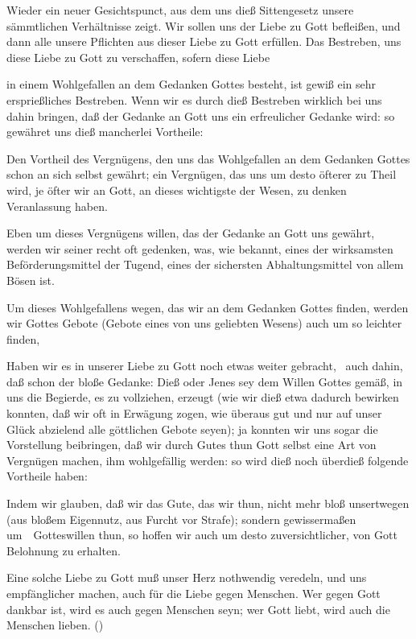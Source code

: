 \begin{aufza}
Wieder ein neuer Gesichtspunct, aus dem uns dieß Sittengesetz unsere sämmtlichen Verhältnisse zeigt. Wir sollen uns der Liebe zu Gott befleißen, und dann alle unsere Pflichten aus dieser Liebe zu Gott erfüllen. Das Bestreben, uns diese Liebe zu Gott zu verschaffen, sofern diese Liebe
\begin{aufzb}
\item in einem Wohlgefallen an dem Gedanken Gottes besteht, ist gewiß ein sehr ersprießliches Bestreben. Wenn wir es durch dieß Bestreben wirklich bei uns dahin bringen, daß der Gedanke an Gott uns ein erfreulicher Gedanke wird: so gewähret uns dieß mancherlei Vortheile:
\begin{aufzc}
\item Den Vortheil des Vergnügens, den uns das Wohlgefallen an dem Gedanken Gottes schon an sich selbst gewährt; ein Vergnügen, das uns um desto öfterer zu Theil wird, je öfter wir an Gott, an dieses wichtigste der Wesen, zu denken Veranlassung haben.
\item Eben um dieses Vergnügens willen, das der Gedanke an Gott uns gewährt, werden wir seiner recht oft gedenken, was, wie bekannt, eines der wirksamsten Beförderungsmittel der Tugend, eines der sichersten Abhaltungsmittel von allem Bösen ist.
\item Um dieses Wohlgefallens wegen, das wir an dem Gedanken Gottes finden, werden wir Gottes Gebote (Gebote eines von uns geliebten Wesens) auch um so leichter finden, \usw\
\end{aufzc}
\item Haben wir es in unserer Liebe zu Gott noch etwas weiter gebracht, \zB\  auch dahin, daß schon der bloße Gedanke: Dieß oder Jenes sey dem Willen Gottes gemäß, in uns die Begierde, es zu vollziehen, erzeugt (wie wir dieß etwa dadurch bewirken konnten, daß wir oft in Erwägung zogen, wie überaus gut und nur auf unser Glück abzielend alle göttlichen Gebote seyen); ja konnten wir uns sogar die Vorstellung beibringen, daß wir durch Gutes thun Gott selbst eine Art von Vergnügen machen, ihm wohlgefällig werden: so wird dieß noch überdieß folgende Vortheile haben:
\begin{aufzc}
\item Indem wir glauben, daß wir das Gute, das wir thun, nicht mehr bloß unsertwegen (aus bloßem Eigennutz, aus Furcht vor Strafe); sondern gewissermaßen um~\ Gotteswillen thun, so hoffen wir auch um desto zuversichtlicher, von Gott Belohnung zu erhalten.
\item Eine solche Liebe zu Gott muß unser Herz nothwendig veredeln, und uns empfänglicher machen, auch für die Liebe gegen Menschen. Wer gegen Gott dankbar ist, wird es auch gegen Menschen seyn; wer Gott liebt, wird auch die Menschen lieben. ()

\end{aufzc}
\end{aufzb}
\end{aufza}
